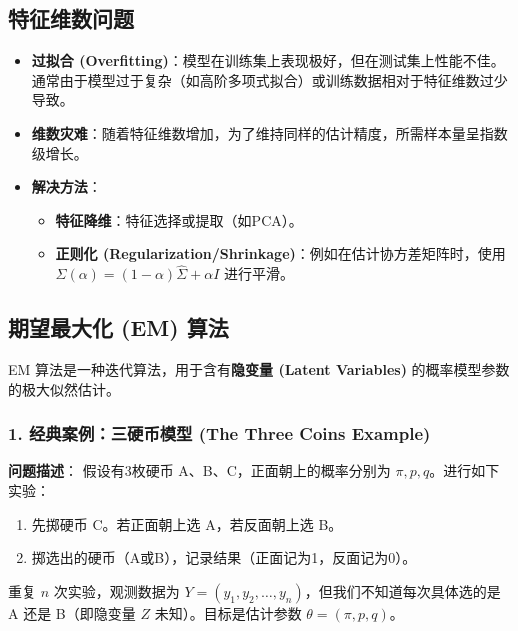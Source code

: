 \documentclass[a4paper, 11pt]{ctexart}
\begin{document}
\subsection{特征维数问题}
\begin{itemize}
    \item \textbf{过拟合 (Overfitting)}：模型在训练集上表现极好，但在测试集上性能不佳。通常由于模型过于复杂（如高阶多项式拟合）或训练数据相对于特征维数过少导致。
    \item \textbf{维数灾难}：随着特征维数增加，为了维持同样的估计精度，所需样本量呈指数级增长。
    \item \textbf{解决方法}：
    \begin{itemize}
        \item \textbf{特征降维}：特征选择或提取（如PCA）。
        \item \textbf{正则化 (Regularization/Shrinkage)}：例如在估计协方差矩阵时，使用 $ \Sigma(\alpha) = (1-\alpha)\hat{\Sigma} + \alpha I $ 进行平滑。
    \end{itemize}
\end{itemize}

\subsection{期望最大化 (EM) 算法}

EM 算法是一种迭代算法，用于含有\textbf{隐变量 (Latent Variables)} 的概率模型参数的极大似然估计。

\subsubsection{1. 经典案例：三硬币模型 (The Three Coins Example)}
\textbf{问题描述}：
假设有3枚硬币 A、B、C，正面朝上的概率分别为 $\pi, p, q$。进行如下实验：
\begin{enumerate}
    \item 先掷硬币 C。若正面朝上选 A，若反面朝上选 B。
    \item 掷选出的硬币（A或B），记录结果（正面记为1，反面记为0）。
\end{enumerate}
重复 $n$ 次实验，观测数据为 $Y = (y_1, y_2, \dots, y_n)$，但我们不知道每次具体选的是 A 还是 B（即隐变量 $Z$ 未知）。目标是估计参数 $\theta = (\pi, p, q)$。
\end{document}

